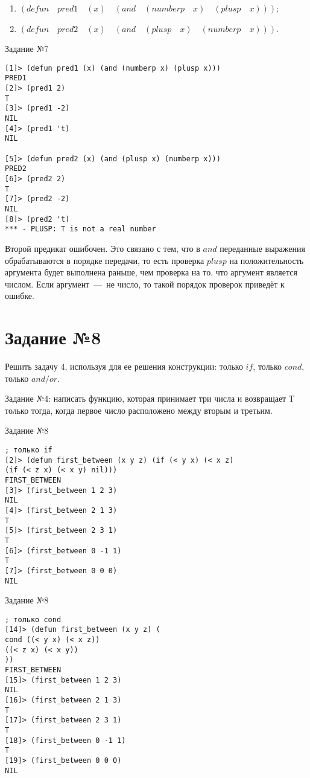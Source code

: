 \begin{enumerate}
	\item $(defun \quad pred1 \quad (x) \quad (and \quad (numberp \quad x) \quad (plusp \quad x)))$;
	\item $(defun \quad pred2 \quad (x) \quad (and \quad (plusp \quad x) \quad (numberp \quad x)))$.
\end{enumerate}

\begin{code}
\caption{Задание №7}
\label{code:bf4}
\begin{verbatim}
[1]> (defun pred1 (x) (and (numberp x) (plusp x)))
PRED1
[2]> (pred1 2)
T
[3]> (pred1 -2)
NIL
[4]> (pred1 't)
NIL

[5]> (defun pred2 (x) (and (plusp x) (numberp x)))
PRED2
[6]> (pred2 2)
T
[7]> (pred2 -2)
NIL
[8]> (pred2 't)
*** - PLUSP: T is not a real number
\end{verbatim}
\end{code}

Второй предикат ошибочен. Это связано с тем, что в $and$ переданные выражения обрабатываются в порядке передачи, то есть проверка $plusp$ на положительность аргумента будет выполнена раньше, чем проверка на то, что аргумент является числом. Если аргумент~---~не число, то такой порядок проверок приведёт к ошибке.

\section{Задание №8}
Решить задачу 4, используя для ее решения конструкции: только $if$, только $cond$, только $and/or$.

Задание №4: написать функцию, которая принимает три числа и возвращает $Т$ только тогда, когда первое число расположено между вторым и третьим.

\begin{code}
\caption{Задание №8}
\label{code:bf4}
\begin{verbatim}
; только if
[2]> (defun first_between (x y z) (if (< y x) (< x z) 
(if (< z x) (< x y) nil)))
FIRST_BETWEEN
[3]> (first_between 1 2 3)
NIL
[4]> (first_between 2 1 3)
T
[5]> (first_between 2 3 1)
T
[6]> (first_between 0 -1 1)
T
[7]> (first_between 0 0 0)
NIL
\end{verbatim}
\end{code}

\newpage

\begin{code}
\caption{Задание №8}
\label{code:bf4}
\begin{verbatim}
; только cond
[14]> (defun first_between (x y z) (
cond ((< y x) (< x z))
((< z x) (< x y))
))
FIRST_BETWEEN
[15]> (first_between 1 2 3)
NIL
[16]> (first_between 2 1 3)
T
[17]> (first_between 2 3 1)
T
[18]> (first_between 0 -1 1)
T
[19]> (first_between 0 0 0)
NIL
\end{verbatim}
\end{code}

